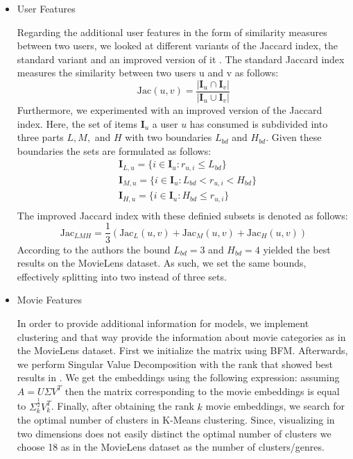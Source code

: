 \documentclass[10pt,conference,compsocconf]{IEEEtran}
\begin{document}
    \begin{itemize}

        \item User Features

        Regarding the additional user features in the form of similarity measures between two users, we looked at different variants of the Jaccard index, the standard variant and an improved version of it \cite{lee_improving_2017}.
        The standard Jaccard index measures the similarity between two users u and v as follows:
        $$\text{Jac}(u,v)=\frac{|\mathbf{I}_u \cap \mathbf{I}_v|}{|\mathbf{I}_u \cup \mathbf{I}_v|}$$
        Furthermore, we experimented with an improved version of the Jaccard index.
        Here, the set of items $\mathbf{I}_u$ a user $u$ has consumed is subdivided into three parts $L,M,$ and $H$ with two boundaries $L_{bd}$ and $H_{bd}$.
        Given these boundaries the sets are formulated as follows:
        \begin{align*}
            &\mathbf{I}_{L,u}=\{i \in \mathbf{I}_u : r_{u,i} \leq L_{bd}\}\\
            &\mathbf{I}_{M,u}=\{i \in \mathbf{I}_u : L_{bd} < r_{u,i} < H_{bd}\}\\
            &\mathbf{I}_{H,u}=\{i \in \mathbf{I}_u : H_{bd} \leq r_{u,i}\}\\
        \end{align*}
        The improved Jaccard index with these definied subsets is denoted as follows:
        $$\text{Jac}_{LMH}=\frac{1}{3}(\text{Jac}_L(u,v) + \text{Jac}_M(u,v) + \text{Jac}_H(u,v))$$
        According to the authors the bound $L_{bd} = 3$ and $H_{bd}=4$ yielded the best results on the MovieLens dataset.
        As such, we set the same bounds, effectively splitting into two instead of three sets.

        \item Movie Features

        In order to provide additional information for models, we implement clustering and that way provide the information
        about movie categories as in the MovieLens dataset.
        First we initialize the matrix using BFM.
        Afterwards, we perform Singular Value Decomposition with the rank that showed best results in .
        We get the embeddings using the following expression: assuming $A=U\Sigma V^T$ then the matrix corresponding to the movie embeddings is equal to $\Sigma _k ^{\frac{1}{2}} V_k ^T$.
        Finally, after obtaining the rank $k$ movie embeddings, we search for the optimal number of clusters in K-Means clustering.
        Since, visualizing in two dimensions does not easily distinct the optimal number of clusters we choose 18 as in the MovieLens dataset as the number of clusters/genres.
    \end{itemize}
\end{document}
